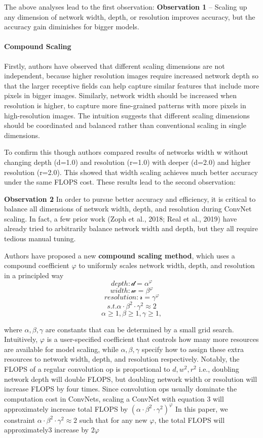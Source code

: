 \documentclass[
]{krantz}
\begin{document}
The above analyses lead to the first observation:
\textbf{Observation 1} -- Scaling up any dimension of network width, depth, or resolution improves accuracy, but the accuracy gain diminishes for bigger models.

\hypertarget{compound-scaling}{%
\paragraph{Compound Scaling}\label{compound-scaling}}

Firstly, authors have observed that different scaling dimensions are not independent, because higher resolution images require increased network depth so that the larger receptive fields can help capture similar features that include more pixels in bigger images. Similarly, network width should be increased when resolution is higher, to capture more fine-grained patterns with more pixels in high-resolution images. The intuition suggests that different scaling dimensions should be coordinated and balanced rather than conventional scaling in single dimensions.

To confirm this though authors compared results of networks width w without changing depth (d=1.0) and resolution (r=1.0) with deeper (d=2.0) and higher resolution (r=2.0). This showed that width scaling achieves much better accuracy under the same FLOPS cost. These results lead to the second observation:

\textbf{Observation 2 } In order to pursue better accuracy and efficiency, it is critical to balance all dimensions of network width, depth, and resolution during ConvNet scaling. In fact, a few prior work (Zoph et al., 2018; Real et al., 2019) have already tried to arbitrarily balance network width and depth, but they all require tedious manual tuning.

Authors have proposed a new \textbf{compound scaling method}, which uses a compound coefficient \(\varphi\) to uniformly scales network width, depth, and resolution in a principled way
\[depth: \mathcal{d}=\alpha^{\varphi} \]
\[ width: \mathcal{w}=\beta^{\varphi}\]
\[ resolution: \mathcal{r}=\gamma^{\varphi}\]
\[s.t.  \alpha\cdot \beta^{2}\cdot \gamma^{2}\approx 2\]
\[ \alpha \ge 1, \beta \ge 1, \gamma \ge 1,\]

where \(\alpha, \beta, \gamma\) are constants that can be determined by a small grid search. Intuitively, \(\varphi\) is a user-specified coefficient that controls how many more resources are available for model scaling, while \(\alpha, \beta, \gamma\) specify how to assign these extra resources to network width, depth, and resolution respectively. Notably, the FLOPS of a regular convolution op is proportional to \(d, w^{2}, r^{2}\) i.e., doubling network depth will double FLOPS, but doubling network width or resolution will increase FLOPS by four times. Since convolution ops usually dominate the computation cost in ConvNets, scaling a ConvNet with equation 3 will approximately increase total FLOPS by \(\left( \alpha\cdot \beta^{2}\cdot \gamma^{2} \right)^{\varphi}\) In this paper, we constraint \(\alpha\cdot \beta^{2}\cdot \gamma^{2}\approx 2\) such that for any new \(\varphi\), the total FLOPS will approximately3 increase by \(2\varphi\)
\end{document}
